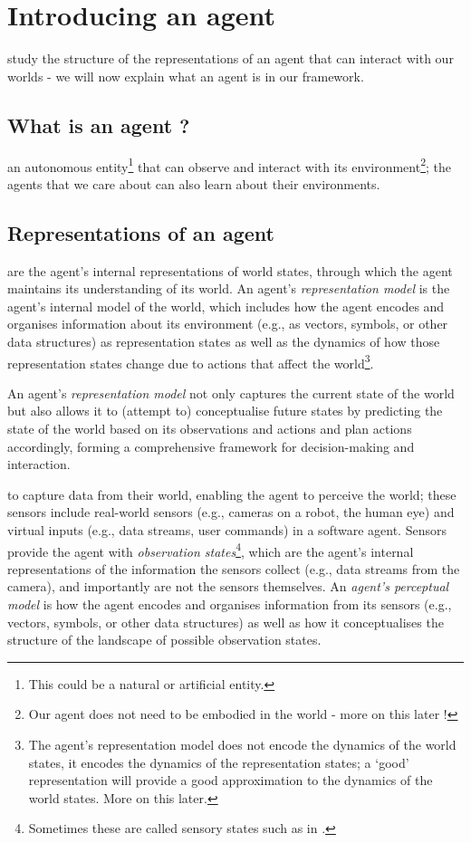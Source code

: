\section{Introducing an agent}
 study the structure of the representations of an agent that can interact with our worlds - we will now explain what an agent is in our framework.

\subsection{What is an agent ?}

 an autonomous entity\footnote{This could be a natural or artificial entity.} that can observe and interact with its environment\footnote{Our agent does not need to be embodied in the world - more on this later !}; the agents that we care about can also learn about their environments.

\subsection{Representations of an agent}

 are the agent's internal representations of world states, through which the agent maintains its understanding of its world.
An agent's \emph{representation model} is the agent's internal model of the world, which includes how the agent encodes and organises information about its environment (e.g., as vectors, symbols, or other data structures) as representation states as well as the dynamics of how those representation states change due to actions that affect the world\footnote{The agent's representation model does not encode the dynamics of the world states, it encodes the dynamics of the representation states; a `good' representation will provide a good approximation to the dynamics of the world states. More on this later.}.

An agent's \emph{representation model} not only captures the current state of the world but also allows it to (attempt to) conceptualise future states by predicting the state of the world based on its observations and actions and plan actions accordingly, forming a comprehensive framework for decision-making and interaction.

 to capture data from their world, enabling the agent to perceive the world; these sensors include real-world sensors (e.g., cameras on a robot, the human eye) and virtual inputs (e.g., data streams, user commands) in a software agent.
Sensors provide the agent with \emph{observation states}\footnote{Sometimes these are called sensory states such as in \cite{Ramstead2020}.}, which are the agent's internal representations of the information the sensors collect (e.g., data streams from the camera), and importantly are not the sensors themselves.
An \emph{agent's perceptual model} is how the agent encodes and organises information from its sensors (e.g., vectors, symbols, or other data structures) as well as how it conceptualises the structure of the landscape of possible observation states.

